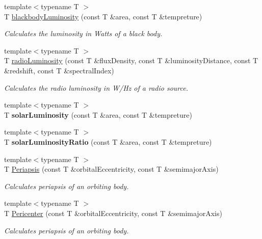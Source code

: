 \begin{DoxyCompactItemize}
{\footnotesize template$<$typename T $>$ }\\T \hyperlink{group___astrophysics_ga909f82edfaed449b44e94788b642ebb8}{blackbody\+Luminosity} (const T \&area, const T \&tempreture)
\begin{DoxyCompactList}\small\item\em Calculates the luminosity in Watts of a black body. \end{DoxyCompactList}\item 
{\footnotesize template$<$typename T $>$ }\\T \hyperlink{group___astrophysics_ga6d6865b2aac1bc7c7f06b7c4ac2444e4}{radio\+Luminosity} (const T \&flux\+Density, const T \&luminosity\+Distance, const T \&redshift, const T \&spectral\+Index)
\begin{DoxyCompactList}\small\item\em Calculates the radio luminosity in W/\+Hz of a radio source. \end{DoxyCompactList}\item 
\mbox{\label{namespace_e_g_x_phys_ade3d05c9dcd810cb5290375d11587b6a}} 
{\footnotesize template$<$typename T $>$ }\\T {\bfseries solar\+Luminosity} (const T \&area, const T \&tempreture)
\item 
\mbox{\label{namespace_e_g_x_phys_ac5e66686d7910587e3636b7984d466e9}} 
{\footnotesize template$<$typename T $>$ }\\T {\bfseries solar\+Luminosity\+Ratio} (const T \&area, const T \&tempreture)
\item 
{\footnotesize template$<$typename T $>$ }\\T \hyperlink{group___periapsis_ga4414ac75539371ec874a3d25cad6c9fe}{Periapsis} (const T \&orbital\+Eccentricity, const T \&semimajor\+Axis)
\begin{DoxyCompactList}\small\item\em Calculates periapsis of an orbiting body. \end{DoxyCompactList}\item 
{\footnotesize template$<$typename T $>$ }\\T \hyperlink{group___periapsis_gac4c419a87a5802cf6afc98f50792e99f}{Pericenter} (const T \&orbital\+Eccentricity, const T \&semimajor\+Axis)
\begin{DoxyCompactList}\small\item\em Calculates periapsis of an orbiting body. \end{DoxyCompactList}\item 

\end{DoxyCompactItemize}
